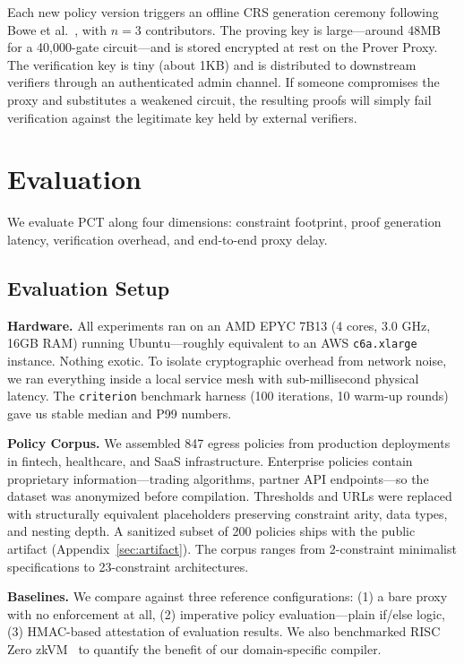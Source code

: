 \documentclass[10pt,conference]{IEEEtran}
\begin{document}
Each new policy version triggers an offline CRS generation ceremony following Bowe et al.~\cite{bowe2017scalable}, with $n=3$ contributors. The proving key is large---around 48MB for a 40,000-gate circuit---and is stored encrypted at rest on the Prover Proxy. The verification key is tiny (about 1KB) and is distributed to downstream verifiers through an authenticated admin channel. If someone compromises the proxy and substitutes a weakened circuit, the resulting proofs will simply fail verification against the legitimate key held by external verifiers.

\section{Evaluation}
\label{sec:evaluation}

We evaluate PCT along four dimensions: constraint footprint, proof generation latency, verification overhead, and end-to-end proxy delay.

\subsection{Evaluation Setup}

\textbf{Hardware.} All experiments ran on an AMD EPYC 7B13 (4 cores, 3.0 GHz, 16GB RAM) running Ubuntu---roughly equivalent to an AWS \texttt{c6a.xlarge} instance. Nothing exotic. To isolate cryptographic overhead from network noise, we ran everything inside a local service mesh with sub-millisecond physical latency. The \texttt{criterion} benchmark harness (100 iterations, 10 warm-up rounds) gave us stable median and P99 numbers.

\textbf{Policy Corpus.} We assembled 847 egress policies from production deployments in fintech, healthcare, and SaaS infrastructure. Enterprise policies contain proprietary information---trading algorithms, partner API endpoints---so the dataset was anonymized before compilation. Thresholds and URLs were replaced with structurally equivalent placeholders preserving constraint arity, data types, and nesting depth. A sanitized subset of 200 policies ships with the public artifact (Appendix~\ref{sec:artifact}). The corpus ranges from 2-constraint minimalist specifications to 23-constraint architectures.

\textbf{Baselines.} We compare against three reference configurations: (1) a bare proxy with no enforcement at all, (2) imperative policy evaluation---plain if/else logic, (3) HMAC-based attestation of evaluation results. We also benchmarked RISC Zero zkVM~\cite{risczero} to quantify the benefit of our domain-specific compiler.
\end{document}
